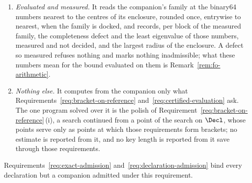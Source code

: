 \begin{requirement}
\begin{enumerate}[label=(\roman*),leftmargin=2.4em]
  whose link it replaces;
  and with (i) above it gives the companion conditions (i)--(vi) and (viii)
  by Proposition~\ref{prop:reference-companion}\,(ii). Condition (vii) is not
  decided on it. Nor does it decide that a block of the companion's measured
  family is a member of a  the companion carries with
  it, which is Corollary~\ref{cor:reference-companion-factors}, on the claims
  that establish the factor enclosures of the handed reference.
\item \emph{Evaluated and measured.} It reads the companion's family at the
  binary64 numbers nearest to the centres of its enclosure, rounded once,
  entrywise to nearest, when the family is docked, and records, per block of
  the measured family, the completeness defect and the least eigenvalue of
  those numbers, measured and not decided, and the largest radius of the
  enclosure. A defect so measured refuses nothing and marks nothing
  inadmissible; what these numbers mean for the bound evaluated on them is
  Remark~\ref{rem:fo-arithmetic}.
\item \emph{Nothing else.} It computes from the companion only what
  Requirements~\ref{req:bracket-on-reference}
  and~\ref{req:certified-evaluation} ask. The one program solved over it is
  the polish of Requirement~\ref{req:bracket-on-reference}\,(i), a search
  continued from a point of the search on $\Decl$, whose points serve only
  as points at which those requirements form brackets; no estimate is
  reported from it, and no key length is reported from it save through
  those requirements.
\end{enumerate}
Requirements~\ref{req:exact-admission} and~\ref{req:declaration-admission}
bind every declaration but a companion admitted under this requirement.
\end{requirement}
